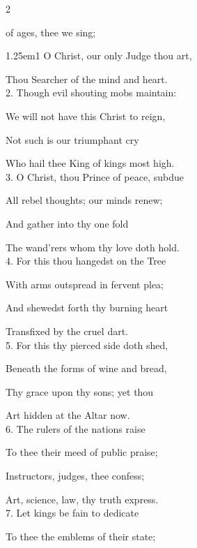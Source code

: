 \begin{paracol}{2}
\sloppy

\firstEvensong
{}

\firstEvensongHymn
{} of ages, thee we sing;


\begin{hangparas}{1.25em}{1}
O Christ, our only Judge thou art,

Thou Searcher of the mind and heart.\\

2. Though evil shouting mobs maintain:

We will not have this Christ to reign,

Not such is our triumphant cry

Who hail thee King of kings most high.\\

3. O Christ, thou Prince of peace, subdue

All rebel thoughts; our minds renew;

And gather into thy one fold

The wand'rers whom thy love doth hold.\\

4. For this thou hangedst on the Tree

With arms outspread in fervent plea;

And shewedst forth thy burning heart

Transfixed by the cruel dart.\\

5. For this thy pierced side doth shed,

Beneath the forms of wine and bread,

Thy grace upon thy sons; yet thou

Art hidden at the Altar now.\\

6. The rulers of the nations raise

To thee their meed of public praise;

Instructors, judges, thee confess;

Art, science, law, thy truth express.\\

7. Let kings be fain to dedicate

To thee the emblems of their state;


\end{hangparas}
\end{paracol}
